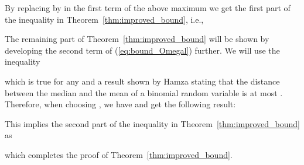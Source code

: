 \documentclass{article}
\begin{document}
By replacing  by  in the first term of the
above maximum we get the first part of the inequality in Theorem~\ref{thm:improved_bound}, i.e.,


The remaining part of Theorem~\ref{thm:improved_bound} will be shown
by developing the second term of (\ref{eq:bound_Omegal}) further.
We will use the inequality

which is true for any  and a result shown by
Hamza \cite{hamza_1995_smallest} stating that the distance between
the median and the mean of a binomial random variable is at most
.
Therefore, when choosing
, we have
 and get the following result:

This implies the second part of the inequality in
Theorem~\ref{thm:improved_bound} as

which completes the proof of Theorem~\ref{thm:improved_bound}.
\end{document}
